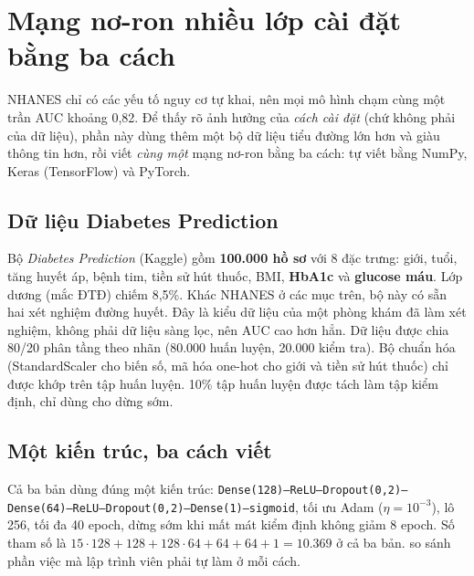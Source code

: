 
\section{Mạng nơ-ron nhiều lớp cài đặt bằng ba cách}
\label{sec:ch2-three}

NHANES chỉ có các yếu tố nguy cơ tự khai, nên mọi mô hình chạm cùng một trần AUC khoảng 0,82. Để thấy rõ ảnh hưởng của \emph{cách cài đặt} (chứ không phải của dữ liệu), phần này dùng thêm một bộ dữ liệu tiểu đường lớn hơn và giàu thông tin hơn, rồi viết \emph{cùng một} mạng nơ-ron bằng ba cách: tự viết bằng NumPy, Keras (TensorFlow) và PyTorch.

\subsection{Dữ liệu Diabetes Prediction}

Bộ \emph{Diabetes Prediction} (Kaggle) gồm \textbf{100.000 hồ sơ} với 8 đặc trưng: giới, tuổi, tăng huyết áp, bệnh tim, tiền sử hút thuốc, BMI, \textbf{HbA1c} và \textbf{glucose máu}. Lớp dương (mắc ĐTĐ) chiếm 8,5\%. Khác NHANES ở các mục trên, bộ này có sẵn hai xét nghiệm đường huyết. Đây là kiểu dữ liệu của một phòng khám đã làm xét nghiệm, không phải dữ liệu sàng lọc, nên AUC cao hơn hẳn. Dữ liệu được chia 80/20 phân tầng theo nhãn (80.000 huấn luyện, 20.000 kiểm tra). Bộ chuẩn hóa (StandardScaler cho biến số, mã hóa one-hot cho giới và tiền sử hút thuốc) chỉ được khớp trên tập huấn luyện. 10\% tập huấn luyện được tách làm tập kiểm định, chỉ dùng cho dừng sớm.

\subsection{Một kiến trúc, ba cách viết}

Cả ba bản dùng đúng một kiến trúc: \texttt{Dense(128)–ReLU–Dropout(0,2)–Dense(64)–ReLU–Dropout(0,2)–Dense(1)–sigmoid}, tối ưu Adam ($\eta=10^{-3}$), lô 256, tối đa 40 epoch, dừng sớm khi mất mát kiểm định không giảm 8 epoch. Số tham số là $15\cdot128+128 + 128\cdot64+64 + 64+1 = 10.369$ ở cả ba bản.  so sánh phần việc mà lập trình viên phải tự làm ở mỗi cách.

